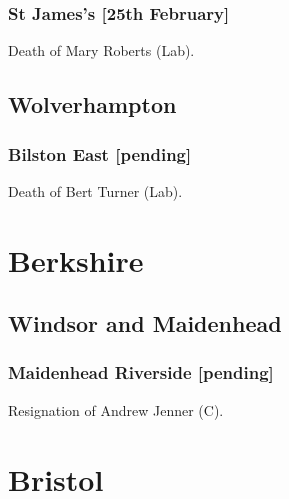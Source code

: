 \documentclass[a4paper,openany]{book}
\begin{document}
\begin{resultsiii}
\subsubsection*{St James's \hspace*{\fill}\nolinebreak[1]%
\enspace\hspace*{\fill}
[25th February]}


Death of Mary Roberts (Lab).

\subsection*{Wolverhampton}

\subsubsection*{Bilston East \hspace*{\fill}\nolinebreak[1]%
\enspace\hspace*{\fill}
[pending]}


Death of Bert Turner (Lab).

\section{Berkshire}

\subsection*{Windsor and Maidenhead}

\subsubsection*{Maidenhead Riverside \hspace*{\fill}\nolinebreak[1]%
\enspace\hspace*{\fill}
[pending]}


Resignation of Andrew Jenner (C).

\section{Bristol}


\end{resultsiii}
\end{document}
